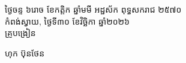 \documentclass[a4paper,10pt]{article}
\begin{document}
\vspace{6pt}
\hfill
\begin{minipage}{10.5cm}
  {\centering
    ថ្ងៃចន្ទ ៦រោច ខែកត្តិក ឆ្នាំមមី អដ្ឋស័ក ពុទ្ធសករាជ ២៥៧០\\[2pt]
    កំពង់ស្វាយ, ថ្ងៃទី៣០ ខែវិច្ឆិកា ឆ្នាំ២០២៦\\[3pt]
    {\muol គ្រូបង្រៀន}\par}
  \vspace{28pt}
  \hfill{\muol ហុក ប៊ុនថែន}\hspace*{1.4cm}
\end{minipage}
\end{document}
